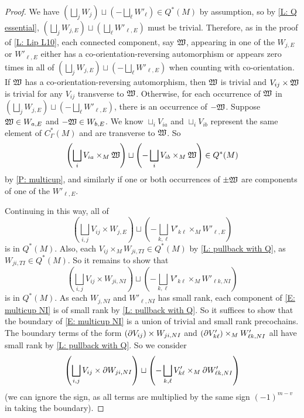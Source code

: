 \begin{proof}
	We have $(\bigsqcup_j W_{j}) \sqcup (-\bigsqcup_\ell W'_{\ell}) \in Q^*(M)$ by assumption, so
	by \cref{L: Q essential}, $\left(\bigsqcup_j W_{j,E}\right) \sqcup \left(\bigsqcup_\ell W'_{\ell,E}\right)$ must be trivial.
	Therefore, as in the proof of \cref{L: Lip L10}, each connected component, say $\mathfrak W$, appearing in one of the $W_{j,E}$ or $W'_{\ell, E}$ either has a co-orientation-reversing automorphism or appears zero times in all of $(\bigsqcup_j W_{j,E}) \sqcup (-\bigsqcup_\ell W'_{\ell,E})$ when counting with co-orientation.
	If $\mathfrak W$ has a co-orientation-reversing automorphism, then $\mathfrak W$ is trivial and $V_{ij} \times \mathfrak W$ is trivial for any $V_{ij}$ transverse to $\mathfrak W$.
	Otherwise, for each occurrence of $\mathfrak W$ in $(\bigsqcup_j W_{j,E}) \sqcup (-\bigsqcup_\ell W'_{\ell,E})$, there is an occurrence of $-\mathfrak W$.
	Suppose $\mathfrak W \in W_{a,E}$ and $-\mathfrak W \in W_{b,E}$.
	We know $\sqcup_i V_{ia}$ and $\sqcup_i V_{ib}$ represent the same element of $C^*_\Gamma(M)$ and are transverse to $\mathfrak W$.
	So
	$$\left(\bigsqcup_i V_{ia} \times_M \mathfrak W\right) \sqcup \left(-\bigsqcup_i V_{ib} \times_M \mathfrak W\right) \in Q^*(M)$$
	by
	\cref{P: multicup}, and similarly if one or both occurrences of $\pm \mathfrak W$ are components of one of the $W'_{\ell, E}$.

	Continuing in this way, all of $$\left(\bigsqcup_{i,j} V_{ij} \times W_{j,E}\right) \sqcup \left(-\bigsqcup_{k,\ell} V'_{k\ell} \times_M W'_{\ell,E}\right)$$
	is in $Q^*(M)$.
	Also, each $V_{ij} \times_M W_{ji,TI} \in Q^*(M)$ by \cref{L: pullback with Q}, as $W_{ji,TI} \in Q^*(M)$.
	So it remains to show that
	\begin{equation}\label{E: multicup NI}
		\left(\bigsqcup_{i,j} V_{ij} \times W_{ji,NI} \right) \sqcup \left(- \bigsqcup_{k,\ell} V'_{k\ell} \times_M W'_{\ell k,NI}\right)
	\end{equation}
	is in $Q^*(M)$.
	As each $W_{j,NI}$ and $W'_{\ell,NI}$ has small rank, each component of \eqref{E: multicup NI} is of small rank by \cref{L: pullback with Q}.
	So it suffices to show that the boundary of \eqref{E: multicup NI} is a union of trivial and small rank precochains.
	The boundary terms of the form $(\partial V_{ij}) \times W_{ji,NI}$ and $(\partial V'_{k\ell}) \times_M W'_{\ell k,NI}$ all have small rank by \cref{L: pullback with Q}.
	So we consider
	$$\left(\bigsqcup_{i,j} V_{ij} \times \partial W_{ji,NI} \right) \sqcup \left(-\bigsqcup_{k,\ell} V'_{k\ell} \times_M \partial W'_{\ell k,NI}\right)$$
	(we can ignore the sign, as all terms are multiplied by the same sign $(-1)^{m-v}$ in taking the boundary).


\end{proof}
